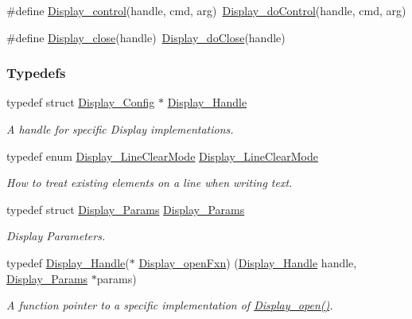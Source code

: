 \begin{DoxyCompactItemize}
\item 
\#define \hyperlink{_display_8h_ad623d21e3c6d821bf6f4bdcfa05ec21f}{Display\+\_\+control}(handle,  cmd,  arg)~\hyperlink{_display_8h_a330f4fa1032c03e41d3efee191b9670b}{Display\+\_\+do\+Control}(handle, cmd, arg)
\item 
\#define \hyperlink{_display_8h_aea13e4e023f2b8020bed2e888cf98599}{Display\+\_\+close}(handle)~\hyperlink{_display_8h_add67d9c5e921786ec12d8029fe6096d1}{Display\+\_\+do\+Close}(handle)
\end{DoxyCompactItemize}
\subsubsection*{Typedefs}
\begin{DoxyCompactItemize}
\item 
typedef struct \hyperlink{struct_display___config}{Display\+\_\+\+Config} $\ast$ \hyperlink{_display_8h_a045a26811755aabf1886d982c49e54ab}{Display\+\_\+\+Handle}
\begin{DoxyCompactList}\small\item\em A handle for specific Display implementations. \end{DoxyCompactList}\item 
typedef enum \hyperlink{_display_8h_a3d9ab99875c344491227a76f1d47e377}{Display\+\_\+\+Line\+Clear\+Mode} \hyperlink{_display_8h_af2fe59ceb3d8c9276018f1ef46e4251c}{Display\+\_\+\+Line\+Clear\+Mode}
\begin{DoxyCompactList}\small\item\em How to treat existing elements on a line when writing text. \end{DoxyCompactList}\item 
typedef struct \hyperlink{struct_display___params}{Display\+\_\+\+Params} \hyperlink{_display_8h_a6b9502df6569d4ba369c01b50c7cdb9f}{Display\+\_\+\+Params}
\begin{DoxyCompactList}\small\item\em Display Parameters. \end{DoxyCompactList}\item 
typedef \hyperlink{_display_8h_a045a26811755aabf1886d982c49e54ab}{Display\+\_\+\+Handle}($\ast$ \hyperlink{_display_8h_a3119ce57fb115a68a37d7ec274cb0001}{Display\+\_\+open\+Fxn}) (\hyperlink{_display_8h_a045a26811755aabf1886d982c49e54ab}{Display\+\_\+\+Handle} handle, \hyperlink{struct_display___params}{Display\+\_\+\+Params} $\ast$params)
\begin{DoxyCompactList}\small\item\em A function pointer to a specific implementation of \hyperlink{_display_8h_a3aa87973a354d4fd6a2969f764e8afe6}{Display\+\_\+open()}. \end{DoxyCompactList}\item 

\end{DoxyCompactItemize}

